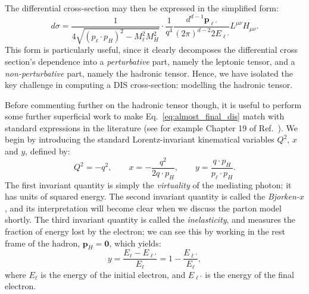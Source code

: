 \documentclass[withindex,glossary]{cam-thesis}
\renewcommand{\vec}[1]{\textbf{#1}} %
\begin{document}
The differential cross-section may then be expressed in the simplified form:
\begin{equation}
\label{eq:almost_final_dis}
d\sigma = \frac{1}{4\sqrt{(p_{\ell} \cdot p_H)^2 - M_{\ell}^2 M_H^2}} \cdot \frac{1}{q^4} \frac{d^{d-1}\vec{p}_{\ell'}}{(2\pi)^{d-2} 2E_{\ell'}} L^{\mu\nu} H_{\mu\nu}.
\end{equation}
This form is particularly useful, since it clearly decomposes the differential cross section's dependence into a \textit{perturbative} part, namely the leptonic tensor, and a \textit{non-perturbative} part, namely the hadronic tensor. Hence, we have isolated the key challenge in computing a DIS cross-section: modelling the hadronic tensor.

Before commenting further on the hadronic tensor though, it is useful to perform some further superficial work to make Eq.~\eqref{eq:almost_final_dis} match with standard expressions in the literature (see for example Chapter 19 of Ref.~\cite{ParticleDataGroup:2022pth}). We begin by introducing the standard Lorentz-invariant kinematical variables $Q^2$, $x$ and $y$, defined by:
\begin{equation}
\label{eq:dis_kinematics}
Q^2 = -q^2, \qquad x = -\frac{q^2}{2q \cdot p_H}, \qquad y = \frac{q \cdot p_H}{p_{\ell} \cdot p_H}.
\end{equation}
The first invariant quantity is simply the \textit{virtuality} of the mediating photon; it has units of squared energy. The second invariant quantity is called the \textit{Bjorken-$x$}, and its interpretation will become clear when we discuss the parton model shortly. The third invariant quantity is called the \textit{inelasticity}, and measures the fraction of energy lost by the electron; we can see this by working in the rest frame of the hadron, $\vec{p}_H = \vec{0}$, which yields:
\begin{equation}
y = \frac{E_{\ell} - E_{\ell'}}{E_{\ell}} = 1 - \frac{E_{\ell'}}{E_{\ell}},
\end{equation}
where $E_{\ell}$ is the energy of the initial electron, and $E_{\ell'}$ is the energy of the final electron.
\end{document}
